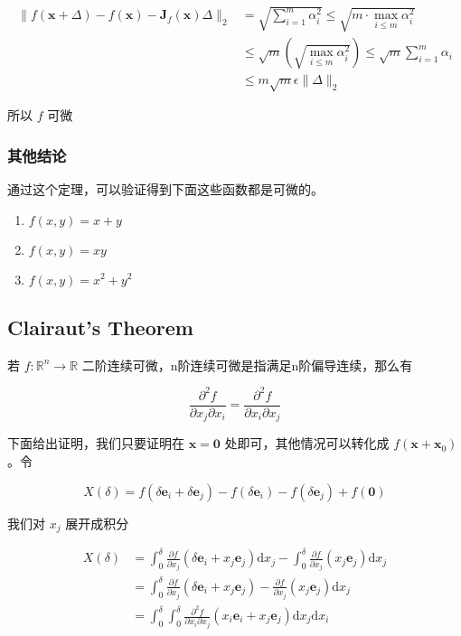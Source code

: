 \documentclass[12pt,a4paper]{ctexart}
\begin{document}
\begin{align*}
\| f(\mathbf{x} + \Delta) - f(\mathbf{x}) - \mathbf{J}_f(\mathbf{x}) \Delta \|_2 &= \sqrt{\sum_{i=1}^{m}\alpha_i^2} \le \sqrt{m \cdot \max_{i \le m} \alpha_i^2} \\
& \le \sqrt{m}(\sqrt{\max_{i \le m} \alpha_i^2}) \le \sqrt{m}\sum_{i=1}^{m} \alpha_i \\
&\le m \sqrt{m} \epsilon \| \Delta \|_2
\end{align*}

所以 $f$ 可微

\subsubsection{其他结论}

通过这个定理，可以验证得到下面这些函数都是可微的。

\begin{enumerate}
    \item $f(x,y) = x + y$
    \item $f(x,y) = xy$
    \item $f(x,y) = x^2 + y^2$
\end{enumerate}

\subsection{Clairaut's Theorem}

若 $f: \mathbb{R}^n \to \mathbb{R}$ 二阶连续可微，n阶连续可微是指满足n阶偏导连续，那么有

\[
\frac{\partial^2 f}{\partial x_j \partial x_i} = 
\frac{\partial^2 f}{\partial x_i \partial x_j}
\]

下面给出证明，我们只要证明在 $\mathbf{x} = \mathbf{0}$ 处即可，其他情况可以转化成 $f(\mathbf{x} + \mathbf{x}_0)$。令 

\[
X(\delta) = f(\delta \mathbf{e}_i + \delta \mathbf{e}_j) - f(\delta \mathbf{e}_i) - f(\delta \mathbf{e}_j) + f(\mathbf{0})
\]

我们对 $x_j$ 展开成积分

\begin{align*}
X(\delta)  &= \int_{0}^{\delta}\frac{\partial f}{\partial x_j}(\delta \mathbf{e}_i + x_j \mathbf{e}_j) \text{d}x_j - \int_{0}^{\delta}\frac{\partial f}{\partial x_j}(x_j \mathbf{e}_j) \text{d}x_j \\
& = \int_{0}^{\delta}\frac{\partial f}{\partial x_j}(\delta \mathbf{e}_i + x_j \mathbf{e}_j) - \frac{\partial f}{\partial x_j}(x_j \mathbf{e}_j) \text{d}x_j \\
&= \int_{0}^{\delta}\int_{0}^{\delta} \frac{\partial^2 f}{\partial x_i \partial x_j}(x_i \mathbf{e}_i + x_j \mathbf{e}_j) \text{d}x_j \text{d}x_i
\end{align*}
\end{document}
